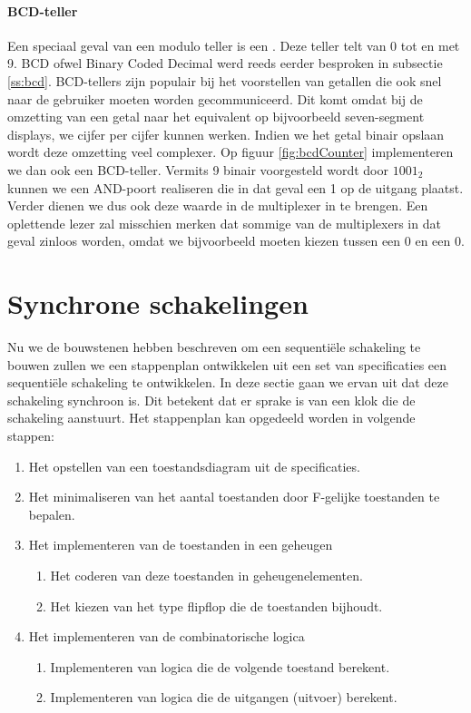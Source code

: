 \paragraph{BCD-teller}
Een speciaal geval van een modulo teller is een . Deze teller telt van 0 tot en met 9. BCD ofwel Binary Coded Decimal werd reeds eerder besproken in subsectie \ref{ss:bcd}. BCD-tellers zijn populair bij het voorstellen van getallen die ook snel naar de gebruiker moeten worden gecommuniceerd. Dit komt omdat bij de omzetting van een getal naar het equivalent op bijvoorbeeld seven-segment displays, we cijfer per cijfer kunnen werken. Indien we het getal binair opslaan wordt deze omzetting veel complexer. Op figuur \ref{fig:bcdCounter} implementeren we dan ook een BCD-teller. Vermits 9 binair voorgesteld wordt door $1001_2$ kunnen we een AND-poort realiseren die in dat geval een 1 op de uitgang plaatst. Verder dienen we dus ook deze waarde in de multiplexer in te brengen. Een oplettende lezer zal misschien merken dat sommige van de multiplexers in dat geval zinloos worden, omdat we bijvoorbeeld moeten kiezen tussen een 0 en een 0.
\section{Synchrone schakelingen}
\label{s:synchroneSequence}
Nu we de bouwstenen hebben beschreven om een sequenti\"ele schakeling te bouwen zullen we een stappenplan ontwikkelen uit een set van specificaties een sequenti\"ele schakeling te ontwikkelen. In deze sectie gaan we ervan uit dat deze schakeling synchroon is. Dit betekent dat er sprake is van een klok die de schakeling aanstuurt. Het stappenplan kan opgedeeld worden in volgende stappen:
\begin{enumerate}
 \item Het opstellen van een toestandsdiagram uit de specificaties.
 \item Het minimaliseren van het aantal toestanden door F-gelijke toestanden te bepalen.
 \item Het implementeren van de toestanden in een geheugen
 \begin{enumerate}
  \item Het coderen van deze toestanden in geheugenelementen.
  \item Het kiezen van het type flipflop die de toestanden bijhoudt.
 \end{enumerate}
 \item Het implementeren van de combinatorische logica
 \begin{enumerate}
  \item Implementeren van logica die de volgende toestand berekent.
  \item Implementeren van logica die de uitgangen (uitvoer) berekent.
 \end{enumerate}
\end{enumerate}
